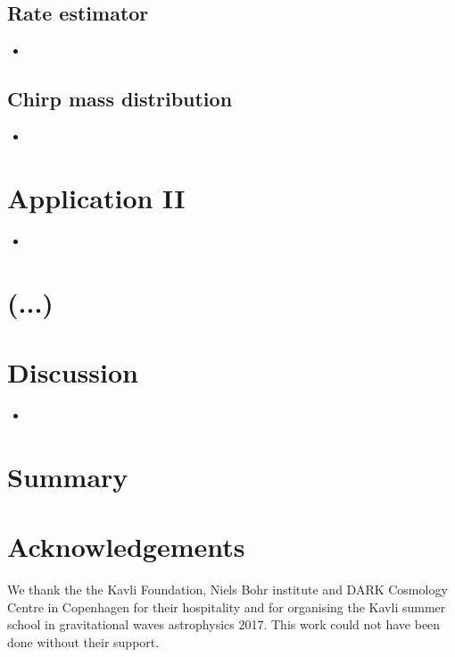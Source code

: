 \documentclass[a4paper,fleqn,usenatbib]{mnras}
\begin{document}
\subsection{Rate estimator}
\label{subsec:RateI}
%
%
\begin{itemize}
\item 
\end{itemize}
%



\subsection{Chirp mass distribution}
\label{subsec:ChirpDistributionI}
%
%
\begin{itemize}
\item 
\end{itemize}
%


\section{Application II}
\label{sec:aplication-II}
%
\begin{itemize}
\item 
\end{itemize}
%


\section{(...)}


\section{Discussion}
\label{sec:discussion}
%
\begin{itemize}
\item 
\end{itemize}
%

\section{Summary }






\section*{Acknowledgements}

We thank the the Kavli Foundation, Niels Bohr institute and DARK Cosmology Centre in Copenhagen for their hospitality and for organising the Kavli summer school in gravitational waves astrophysics 2017. This work could not have been done without their support. 
\end{document}
